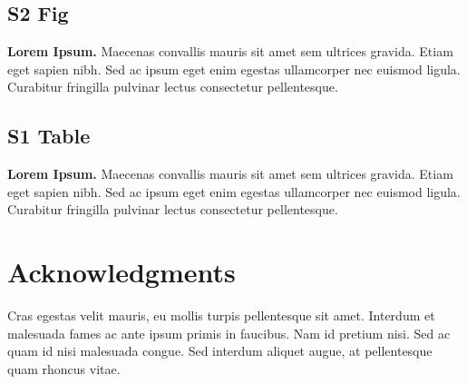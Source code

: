 \documentclass[10pt,letterpaper]{article}
\begin{document}
\subsection*{S2 Fig}
\label{S2_Fig}
{\bf Lorem Ipsum.} Maecenas convallis mauris sit amet sem ultrices gravida. Etiam eget sapien nibh. Sed ac ipsum eget enim egestas ullamcorper nec euismod ligula. Curabitur fringilla pulvinar lectus consectetur pellentesque.

\subsection*{S1 Table}
\label{S1_Table}
{\bf Lorem Ipsum.} Maecenas convallis mauris sit amet sem ultrices gravida. Etiam eget sapien nibh. Sed ac ipsum eget enim egestas ullamcorper nec euismod ligula. Curabitur fringilla pulvinar lectus consectetur pellentesque.

\section*{Acknowledgments}
Cras egestas velit mauris, eu mollis turpis pellentesque sit amet. Interdum et malesuada fames ac ante ipsum primis in faucibus. Nam id pretium nisi. Sed ac quam id nisi malesuada congue. Sed interdum aliquet augue, at pellentesque quam rhoncus vitae.

\nolinenumbers

%
%
% 




\printbibliography
\end{document}
